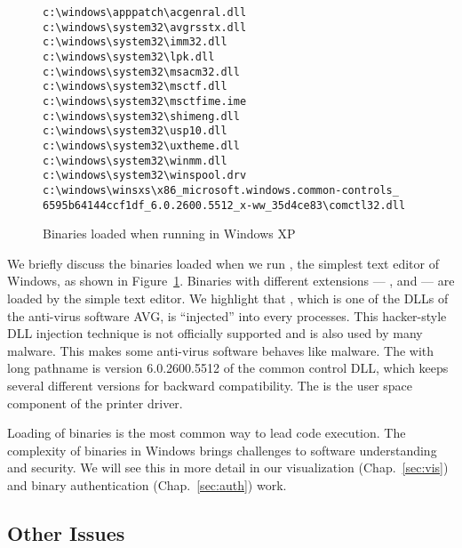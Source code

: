\begin{figure}[htb]
\small
\begin{verbatim}
c:\windows\apppatch\acgenral.dll
c:\windows\system32\avgrsstx.dll
c:\windows\system32\imm32.dll
c:\windows\system32\lpk.dll
c:\windows\system32\msacm32.dll
c:\windows\system32\msctf.dll
c:\windows\system32\msctfime.ime
c:\windows\system32\shimeng.dll
c:\windows\system32\usp10.dll
c:\windows\system32\uxtheme.dll
c:\windows\system32\winmm.dll
c:\windows\system32\winspool.drv
c:\windows\winsxs\x86_microsoft.windows.common-controls_
6595b64144ccf1df_6.0.2600.5512_x-ww_35d4ce83\comctl32.dll
\end{verbatim}
\caption{Binaries loaded when running  in Windows XP}
\label{fig:notepad-bin}
\end{figure}

We briefly discuss the binaries loaded when we run ,
the simplest text editor of Windows, as shown in Figure~\ref{fig:notepad-bin}.
Binaries with different extensions --- ,  and 
--- are loaded by the simple text editor.
We highlight that ,
which is one of the DLLs of the anti-virus software AVG,
is ``injected'' into every processes.
This hacker-style DLL injection technique is not officially supported and
is also used by many malware.
This makes some anti-virus software behaves like malware.
The  with long pathname is version 6.0.2600.5512 of
the common control DLL, which keeps several different versions
for backward compatibility. 
The  is the user space component of the printer
driver.

Loading of binaries is the most common way to lead code execution.
The complexity of binaries in Windows brings challenges to software understanding
and security.
We will see this in more detail in our visualization
(Chap.~\ref{sec:vis}) and binary authentication (Chap.~\ref{sec:auth}) work.

\subsection{Other Issues}


